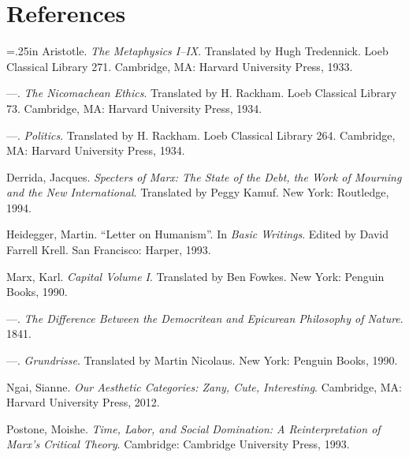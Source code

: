 \documentclass[12pt]{article}
\makeatletter
\newcommand{\hangpara}[2]{\hangindent#1\hangafter#2\noindent}
\newenvironment{hangparas}[2]{\setlength{\parindent}{\z@}%
  \everypar={\hangpara{#1}{#2}}}{\par}
\makeatother
\begin{document}
\section{References}
\begin{singlespacing}
\begin{hangparas}{.25in}{1}
Aristotle. \textit{The Metaphysics I--IX}. Translated by Hugh Tredennick. Loeb Classical Library 271. Cambridge, MA: Harvard University Press, 1933.

---. \textit{The Nicomachean Ethics}. Translated by H. Rackham. Loeb Classical Library 73. Cambridge, MA: Harvard University Press, 1934.

---. \textit{Politics}. Translated by H. Rackham. Loeb Classical Library 264. Cambridge, MA: Harvard University Press, 1934.

Derrida, Jacques. \textit{Specters of Marx: The State of the Debt, the Work of Mourning and the New International}. Translated by Peggy Kamuf. New York: Routledge, 1994.

Heidegger, Martin. ``Letter on Humanism''. In \textit{Basic Writings}. Edited by David Farrell Krell. San Francisco: Harper, 1993.

Marx, Karl. \textit{Capital Volume I}. Translated by Ben Fowkes. New York: Penguin Books, 1990.

---. \textit{The Difference Between the Democritean and Epicurean Philosophy of Nature}. 1841.

---. \textit{Grundrisse}. Translated by Martin Nicolaus. New York: Penguin Books, 1990.

Ngai, Sianne. \textit{Our Aesthetic Categories: Zany, Cute, Interesting}. Cambridge, MA: Harvard University Press, 2012.

Postone, Moishe. \textit{Time, Labor, and Social Domination: A Reinterpretation of Marx's Critical Theory}. Cambridge: Cambridge University Press, 1993.
\end{hangparas}
\end{singlespacing}
\end{document}
